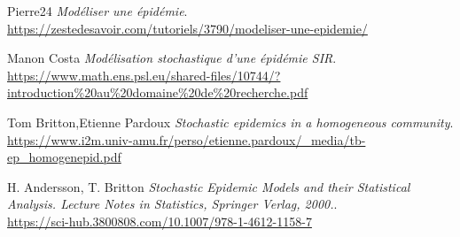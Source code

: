 \documentclass[11pt]{report}
\begin{document}
    \listoffigures
    \listoftables
    \renewcommand{\bibname}{Bibliographie}
    
    \begin{thebibliography}{99} %
    \addto\captionsfrench{\renewcommand{\refname}{Bibliographie}}
	Pierre24
	\emph{Modéliser une épidémie}.\\
	\url{https://zestedesavoir.com/tutoriels/3790/modeliser-une-epidemie/}
	
	Manon Costa
	\emph{Modélisation stochastique d’une épidémie SIR}.\\
	\url{https://www.math.ens.psl.eu/shared-files/10744/?introduction%20au%20domaine%20de%20recherche.pdf}
	
	
	Tom Britton,Etienne Pardoux
	\emph{Stochastic epidemics in a homogeneous community}.\\
	\url{https://www.i2m.univ-amu.fr/perso/etienne.pardoux/_media/tb-ep_homogenepid.pdf}
	
	H. Andersson, T. Britton
	\emph{Stochastic Epidemic Models and their Statistical Analysis. Lecture Notes in Statistics, Springer Verlag, 2000.}.\\
	\url{https://sci-hub.3800808.com/10.1007/978-1-4612-1158-7}






	\end{thebibliography}
\end{document}
